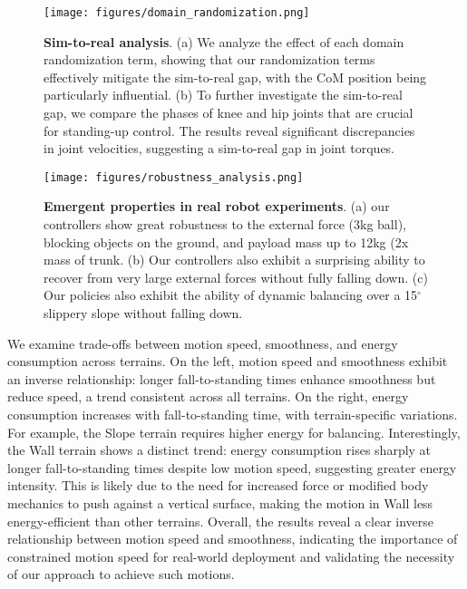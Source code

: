 \begin{figure*}[t]
    \centering
    \texttt{[image: figures/domain\_randomization.png]}
    \vspace{-0.2in}
    \caption{\textbf{Sim-to-real analysis}. (a) We analyze the effect of each domain randomization term, showing that our randomization terms effectively mitigate the sim-to-real gap, with the CoM position being particularly influential. (b) To further investigate the sim-to-real gap, we compare the phases of knee and hip joints that are crucial for standing-up control. The results reveal significant discrepancies in joint velocities, suggesting a sim-to-real gap in joint torques. }
    \vspace{-0.13in}
    \label{fig:sim2real}
\end{figure*}
\begin{figure*}[t]
    \centering
    \texttt{[image: figures/robustness\_analysis.png]}
    \caption{\textbf{Emergent properties in real robot experiments}. (a) our controllers show great robustness to the external force (3kg ball), blocking objects on the ground, and payload mass up to 12kg (2x mass of trunk. (b) Our controllers also exhibit a surprising ability to recover from very large external forces without fully falling down. (c) Our policies also exhibit the ability of dynamic balancing over a 15$^\circ$ slippery slope without falling down.}
    \label{fig:real_robustness}
    \vspace{-0.17in}
\end{figure*}

 We examine trade-offs between motion speed, smoothness, and energy consumption across terrains. On the left, motion speed and smoothness exhibit an inverse relationship: longer fall-to-standing times enhance smoothness but reduce speed, a trend consistent across all terrains. On the right, energy consumption increases with fall-to-standing time, with terrain-specific variations. For example, the Slope terrain requires higher energy for balancing. Interestingly, the Wall terrain shows a distinct trend: energy consumption rises sharply at longer fall-to-standing times despite low motion speed, suggesting greater energy intensity. This is likely due to the need for increased force or modified body mechanics to push against a vertical surface, making the motion in Wall less energy-efficient than other terrains. Overall, the results reveal a clear inverse relationship between motion speed and smoothness, indicating the importance of constrained motion speed for real-world deployment and validating the necessity of our approach to achieve such motions.



